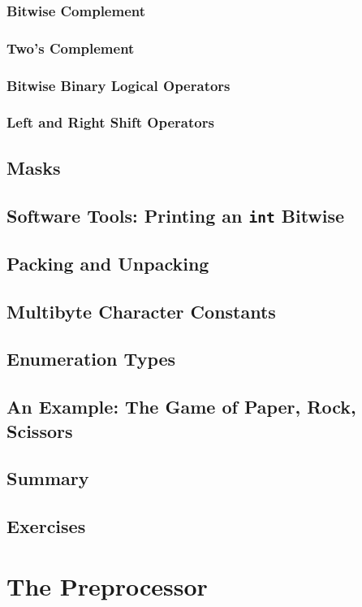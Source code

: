 \documentclass[12pt]{book}
\begin{document}
\subsection{Bitwise Complement}
\subsection{Two’s Complement}
\subsection{Bitwise Binary Logical Operators}
\subsection{Left and Right Shift Operators}
\section{Masks}
\section{Software Tools: Printing an \texttt{int} Bitwise}
\section{Packing and Unpacking}
\section{Multibyte Character Constants}
\section{Enumeration Types}
\section{An Example: The Game of Paper, Rock, Scissors}
\section{Summary}
\section{Exercises}

\chapter{The Preprocessor}
\end{document}
